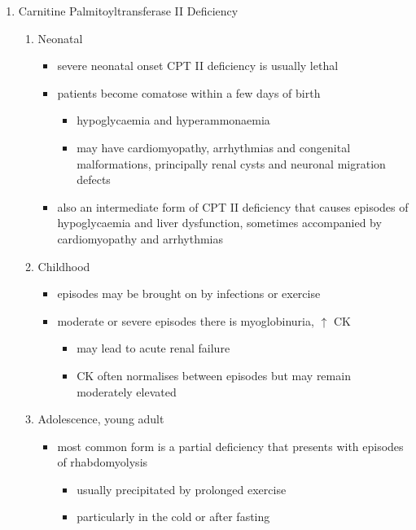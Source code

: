 \documentclass{scrartcl}
\begin{document}
\begin{enumerate}
\item Carnitine Palmitoyltransferase II Deficiency
\label{sec:org031aa9e}
\begin{enumerate}
\item Neonatal
\label{sec:orga7ef906}
\begin{itemize}
\item severe neonatal onset CPT II deficiency is usually lethal
\item patients become comatose within a few days of birth
\begin{itemize}
\item hypoglycaemia and hyperammonaemia
\item may have cardiomyopathy, arrhythmias and congenital malformations,
principally renal cysts and neuronal migration defects
\end{itemize}
\item also an intermediate form of CPT II deficiency that causes
episodes of hypoglycaemia and liver dysfunction, sometimes
accompanied by cardiomyopathy and arrhythmias
\end{itemize}

\item Childhood
\label{sec:org402ec37}
\begin{itemize}
\item episodes may be brought on by infections or exercise
\item moderate or severe episodes there is myoglobinuria, \(\uparrow\) CK
\begin{itemize}
\item may lead to acute renal failure
\item CK often normalises between episodes but may remain moderately
elevated
\end{itemize}
\end{itemize}

\item Adolescence,  young adult
\label{sec:org3dc60f1}
\begin{itemize}
\item most common form is a partial deficiency that presents with
episodes of rhabdomyolysis
\begin{itemize}
\item usually precipitated by prolonged exercise
\item particularly in the cold or after fasting
\end{itemize}
\end{itemize}
\end{enumerate}
\end{enumerate}
\end{document}
